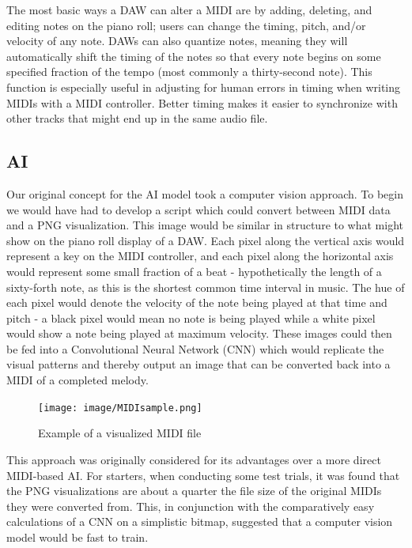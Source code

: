 The most basic ways a DAW can alter a MIDI are by adding, deleting, and editing notes on the
piano roll; users can change the timing, pitch, and/or velocity of any note. DAWs can also
quantize notes, meaning they will automatically shift the timing of the notes so that every
note begins on some specified fraction of the tempo (most commonly a thirty-second note).
This function is especially useful in adjusting for human errors in timing when writing MIDIs
with a MIDI controller. Better timing makes it easier to synchronize with other tracks that might
end up in the same audio file.


\subsection{AI}

Our original concept for the AI model took a computer vision approach. To begin we would
have had to develop a script which could convert between MIDI data and a PNG
visualization. This image would be similar in structure to what might show on the piano
roll display of a DAW. Each pixel along the vertical axis would represent a key on the
MIDI controller, and each pixel along the horizontal axis would represent some small
fraction of a beat - hypothetically the length of a sixty-forth note, as this is the
shortest common time interval in music. The hue of each pixel would denote the velocity
of the note being played at that time and pitch - a black pixel would mean no note is
being played while a white pixel would show a note being played at maximum velocity.
These images could then be fed into a Convolutional Neural Network (CNN) which would
replicate the visual patterns and thereby output an image that can be converted back into
a MIDI of a completed melody.

\begin{figure}[h!]
  \centering
  \texttt{[image: image/MIDIsample.png]}
  \caption{Example of a visualized MIDI file}
  \label{fig:midi_sample}
\end{figure}

This approach was originally considered for its advantages over a more direct MIDI-based
AI. For starters, when conducting some test trials, it was found that the PNG
visualizations are about a quarter the file size of the original MIDIs they were converted
from. This, in conjunction with the comparatively easy calculations of a CNN on a
simplistic bitmap, suggested that a computer vision model would be fast to train.

